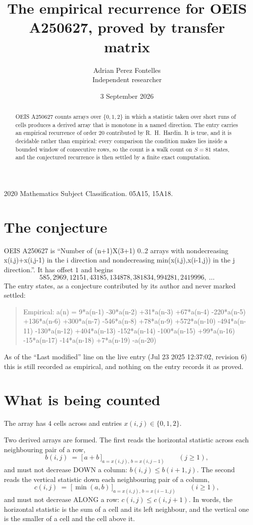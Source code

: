 \documentclass[11pt,a4paper]{article}
\title{The empirical recurrence for OEIS A250627, proved by transfer matrix}
\author{Adrian Perez Fontelles\\ \small Independent researcher}
\date{3 September 2026}
\theoremstyle{plain}
\theoremstyle{definition}
\begin{document}
\maketitle

\begin{abstract}
OEIS A250627 counts arrays over $\{0,1,2\}$ in which a statistic taken over short runs
of cells produces a derived array that is monotone in a named direction. The entry carries an
empirical recurrence of order $20$ contributed by R.~H.~Hardin. It is true, and it is
decidable rather than empirical: every comparison the condition makes lies inside a bounded
window of consecutive rows, so the count is a walk count on $S=81$ states, and the
conjectured recurrence is then settled by a finite exact computation.
\end{abstract}

\noindent\small 2020 Mathematics Subject Classification. 05A15, 15A18.\normalsize

\section{The conjecture}

OEIS A250627 is ``Number of (n+1)X(3+1) 0..2 arrays with nondecreasing x(i,j)+x(i,j-1) in the i direction and nondecreasing min(x(i,j),x(i-1,j)) in the j direction.''. It has offset $1$ and begins
\[
585, 2969, 12151, 43185, 134878, 381834, 994281, 2419996,\ \dots
\]
The entry states, as a conjecture contributed by its author and never marked settled:
\begin{quote}
Empirical: a(n) = 9*a(n-1) -30*a(n-2) +31*a(n-3) +67*a(n-4) -220*a(n-5) +136*a(n-6) +300*a(n-7) -546*a(n-8) +78*a(n-9) +572*a(n-10) -494*a(n-11) -130*a(n-12) +404*a(n-13) -152*a(n-14) -100*a(n-15) +99*a(n-16) -15*a(n-17) -14*a(n-18) +7*a(n-19) -a(n-20)
\end{quote}
As of the ``Last modified'' line on the live entry (Jul 23 2025 12:37:02, revision 6) this is still
recorded as empirical, and nothing on the entry records it as proved.

\section{What is being counted}

The array has $4$ cells across and entries $x(i,j)\in\{0,1,2\}$.

Two derived arrays are formed. The first reads the horizontal statistic across each
neighbouring pair of a row,
\[
b(i,j)\;=\;\bigl[\,a+b\,\bigr]_{a=x(i,j),\,b=x(i,j-1)}\qquad (j\ge1),
\]
and must not decrease DOWN a column: $b(i,j)\le b(i{+}1,j)$. The second reads the vertical
statistic down each neighbouring pair of a column,
\[
c(i,j)\;=\;\bigl[\,\min(a,b)\,\bigr]_{a=x(i,j),\,b=x(i{-}1,j)}\qquad (i\ge1),
\]
and must not decrease ALONG a row: $c(i,j)\le c(i,j{+}1)$. In words, the horizontal statistic
is the sum of a cell and its left neighbour, and the vertical one is
the smaller of a cell and the cell above it.
\end{document}
